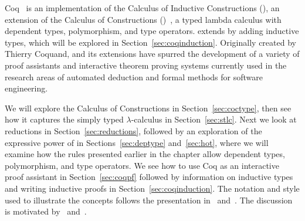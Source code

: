 
Coq~\cite{coq,coqart} is an implementation of the Calculus of Inductive Constructions (\cic{}), an extension of the Calculus of Constructions (\coc{})~\cite{coc}, a typed lambda calculus with dependent types, polymorphism, and type operators. \cic{} extends \coc{} by adding inductive types, which will be explored in Section~\ref{sec:coqinduction}. Originally created by Thierry Coquand, \coc{} and its extensions have spurred the development of a variety of proof assistants and interactive theorem proving systems currently used in the research areas of automated deduction and formal methods for software engineering.


We will explore the Calculus of Constructions in Section~\ref{sec:coctype}, then see how it captures the simply typed $\lambda$-calculus in Section~\ref{sec:stlc}. Next we look at reductions in Section~\ref{sec:reductions}, followed by an exploration of the expressive power of \coc{} in Sections~\ref{sec:deptype} and~\ref{sec:hot}, where we will examine how the rules presented earlier in the chapter allow dependent types, polymorphism, and type operators.
We see how to use Coq as an interactive proof assistant in Section~\ref{sec:coqpf} followed by information on inductive types and writing inductive proofs in Section~\ref{sec:coqinduction}.
The notation and style used to illustrate the concepts follows the presentation in~\cite{coqart} and~\cite{coq}. The discussion is motivated by~\cite{coqart} and~\cite{coc}. %



